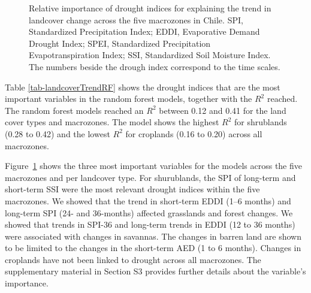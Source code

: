 \documentclass[
  authoryear,
  preprint,
  3p,
  onecolumn]{elsarticle}
\begin{document}
\begin{figure}[!ht]


\caption{\label{fig-varImportance}Relative importance of drought indices
for explaining the trend in landcover change across the five macrozones
in Chile. SPI, Standardized Precipitation Index; EDDI, Evaporative
Demand Drought Index; SPEI, Standardized Precipitation
Evapotranspiration Index; SSI, Standardized Soil Moisture Index. The
numbers beside the drough index correspond to the time scales.}

\end{figure}%

Table \ref{tab-landcoverTrendRF} shows the drought indices that are the
most important variables in the random forest models, together with the
\(R^2\) reached. The random forest models reached an \(R^2\) between
0.12 and 0.41 for the land cover types and macrozones. The model shows
the highest \(R^2\) for shrublands (0.28 to 0.42) and the lowest \(R^2\)
for croplands (0.16 to 0.20) across all macrozones.

Figure~\ref{fig-varImportance} shows the three most important variables
for the models across the five macrozones and per landcover type. For
shurublands, the SPI of long-term and short-term SSI were the most
relevant drought indices within the five macrozones. We showed that the
trend in short-term EDDI (1--6 months) and long-term SPI (24- and
36-months) affected grasslands and forest changes. We showed that trends
in SPI-36 and long-term trends in EDDI (12 to 36 months) were associated
with changes in savannas. The changes in barren land are shown to be
limited to the changes in the short-term AED (1 to 6 months). Changes in
croplands have not been linked to drought across all macrozones. The
supplementary material in Section S3 provides further details about the
variable's importance.
\end{document}
